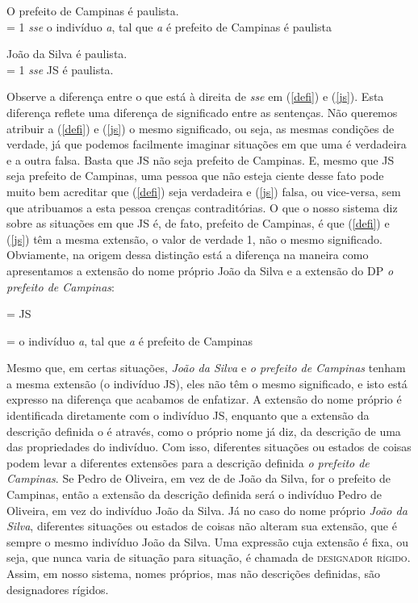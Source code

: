 \begin{exe}
\ex O prefeito de Campinas é paulista.\\
\den{(\ref{defi})} = 1 \textit{sse} o indivíduo \textit{a}, tal
que \textit{a} é prefeito de Campinas é paulista\label{defi}
\end{exe}

\begin{exe}
\ex João da Silva é paulista.\\
\den{(\ref{js})} = 1 \textit{sse} JS é paulista.\label{js}
\end{exe}


\n Observe a diferença entre o que está à direita de \textit{sse}
em (\ref{defi}) e (\ref{js}). Esta diferença reflete uma diferença
de significado entre as sentenças. Não queremos atribuir a
(\ref{defi}) e (\ref{js}) o mesmo significado, ou seja, as mesmas
condições de verdade, já que podemos facilmente imaginar situações
em que uma é verdadeira e a outra falsa. Basta que JS não seja
prefeito de Campinas. E, mesmo que JS seja prefeito de Campinas,
uma pessoa que não esteja ciente desse fato pode muito bem
acreditar que (\ref{defi}) seja verdadeira e (\ref{js}) falsa, ou
vice-versa, sem que atribuamos a esta pessoa crenças
contraditórias. O que o nosso sistema diz sobre as situações em
que JS é, de fato, prefeito de Campinas, é que (\ref{defi}) e
(\ref{js}) têm a mesma extensão, o valor de verdade 1, não o mesmo
significado. Obviamente, na origem dessa distinção está a
diferença na maneira como apresentamos a extensão do nome próprio
João da Silva e a extensão do DP \textit{o prefeito de Campinas}:

\begin{exe}
	\ex {} = JS
\end{exe}

\begin{exe}
	\ex {} = o indivíduo \textit{a}, tal que \textit{a} é prefeito de Campinas
\end{exe}

\n Mesmo que, em certas situações, \textit{João da Silva} e \textit{o prefeito de Campinas} tenham a mesma extensão (o indivíduo JS), eles não têm o
mesmo significado, e isto está expresso na diferença que acabamos
de enfatizar. A extensão do nome próprio é identificada
diretamente com o indivíduo JS, enquanto que a extensão da
descrição definida o é através, como o próprio nome já diz, da
descrição de uma das propriedades do indivíduo. Com isso,
diferentes situações ou estados de coisas podem levar a diferentes
extensões para a descrição definida \textit{o prefeito de Campinas}. Se
Pedro de Oliveira, em vez de de João da Silva, for o prefeito de
Campinas, então a extensão da descrição definida será o indivíduo
Pedro de Oliveira, em vez do indivíduo João da Silva. Já no caso
do nome próprio \textit{João da Silva}, diferentes situações ou estados
de coisas não alteram sua extensão, que é sempre o mesmo indivíduo
João da Silva. Uma expressão cuja extensão é fixa, ou seja, que
nunca varia de situação para situação, é chamada de
\textsc{designador rígido}. Assim, em nosso sistema, nomes
próprios, mas não descrições definidas, são designadores rígidos.

